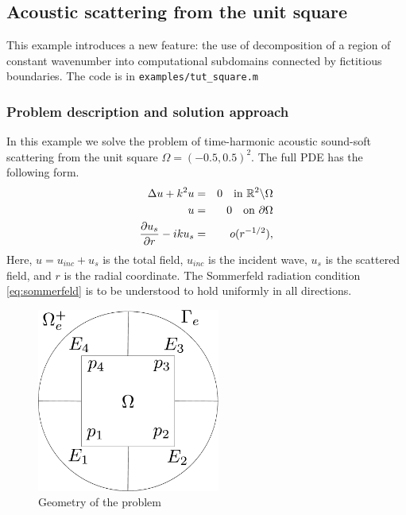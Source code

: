 \subsection{Acoustic scattering from the unit square}
\label{s:square}

This example introduces a new feature: the use of decomposition
of a region of constant wavenumber into computational subdomains connected
by fictitious boundaries. The code is in \verb?examples/tut_square.m?

\subsubsection{Problem description and solution approach}
\label{s:scatbvp}

In this example we solve the problem of time-harmonic 
acoustic sound-soft scattering from the unit square $\Omega=(-0.5,0.5)^2$.
The full PDE has the following form.
\begin{eqnarray}
\Delta u+k^2u & = & 0  \quad \text{in
}\mathbb{R}^2\backslash\Omega\label{eq:helm}\\
u&=&0 \quad \text{on } {\partial\Omega} \label{eq:soundsoft}\\
\frac{\partial u_s}{\partial r}-iku_s & = & o(r^{-1/2}),\label{eq:sommerfeld}
\end{eqnarray}
Here, $u=u_{inc}+u_s$ is the total field, $u_{inc}$ is the incident
wave, $u_s$ is the scattered field, and $r$ is the radial coordinate.
The Sommerfeld radiation condition
\eqref{eq:sommerfeld} is to be understood to hold uniformly in all
directions. 

\begin{figure}
\center
\includegraphics[width=6cm]{geometry}
\vspace{-.5cm}
\caption{Geometry of the problem}
\label{fig:geom}
\end{figure}


